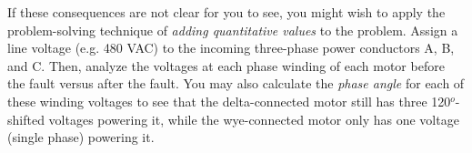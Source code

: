 \vskip 10pt

If these consequences are not clear for you to see, you might wish to apply the problem-solving technique of {\it adding quantitative values} to the problem.  Assign a line voltage (e.g. 480 VAC) to the incoming three-phase power conductors A, B, and C.  Then, analyze the voltages at each phase winding of each motor before the fault versus after the fault.  You may also calculate the {\it phase angle} for each of these winding voltages to see that the delta-connected motor still has three 120$^{o}$-shifted voltages powering it, while the wye-connected motor only has one voltage (single phase) powering it.











